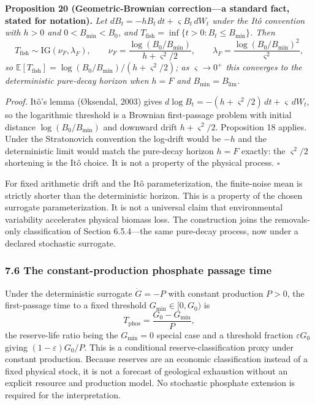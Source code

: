 \documentclass[11pt]{article}
\begin{document}
\textbf{Proposition 20 (Geometric-Brownian correction---a standard
fact, stated for notation).} \emph{Let
\(dB_t = -hB_t\, dt + \varsigma B_t\, dW_t\) under the It\^o convention
with \(h > 0\) and \(0 < B_{\min} < B_0\), and
\(T_{\mathrm{fish}} = \inf\{ t > 0 : B_t \le B_{\min} \}\). Then}
\[T_{\mathrm{fish}} \sim \mathrm{IG}(\nu_F, \lambda_F), \qquad \nu_F = \frac{\log(B_0/\allowbreak{}B_{\min})}{h + \varsigma^2/\allowbreak{}2}, \qquad \lambda_F = \frac{\log(B_0/\allowbreak{}B_{\min})^2}{\varsigma^2},\]
\emph{so
\(\mathbb{E}[T_{\mathrm{fish}}] = \log(B_0/\allowbreak{}B_{\min})/(h + \varsigma^2/\allowbreak{}2)\);
as \(\varsigma \to 0^+\) this converges to the deterministic pure-decay
horizon when \(h = F\) and \(B_{\min} = B_{\lim}\).}

\emph{Proof.} It\^o's lemma (\O{}ksendal, 2003) gives \(d\log B_t = -(h + \varsigma^2/\allowbreak{}2)\, dt + \varsigma\, dW_t\), so the logarithmic threshold is a Brownian first-passage problem with initial distance \(\log(B_0/\allowbreak{}B_{\min})\) and downward drift \(h + \varsigma^2/\allowbreak{}2\). Proposition 18 applies. Under the Stratonovich convention the log-drift would be \(-h\) and the deterministic limit would match the pure-decay horizon \(h = F\) exactly: the \(\varsigma^2/\allowbreak{}2\) shortening is the It\^o choice. It is not a property of the physical process. \ensuremath{\square}

For fixed arithmetic drift and the It\^o parameterization, the finite-noise mean is strictly shorter than the deterministic horizon. This is a property of the chosen surrogate parameterization. It is not a universal claim that environmental variability accelerates physical biomass loss. The construction joins the removals-only classification of Section 6.5.4---the same pure-decay process, now under a declared stochastic surrogate.

\subsubsection{7.6 The constant-production phosphate passage
time}\label{the-constant-production-phosphate-passage-time}

Under the deterministic surrogate \(\dot G = -P\) with constant production \(P > 0\), the first-passage time to a fixed threshold \(G_{\min} \in [0, G_0)\) is \[T_{\mathrm{phos}} = \frac{G_0 - G_{\min}}{P},\] the reserve-life ratio being the \(G_{\min} = 0\) special case and a threshold fraction \(\varepsilon G_0\) giving \((1-\varepsilon)G_0/\allowbreak{}P\). This is a conditional reserve-classification proxy under constant production. Because reserves are an economic classification instead of a fixed physical stock, it is not a forecast of geological exhaustion without an explicit resource and production model. No stochastic phosphate extension is required for the interpretation.
\end{document}
